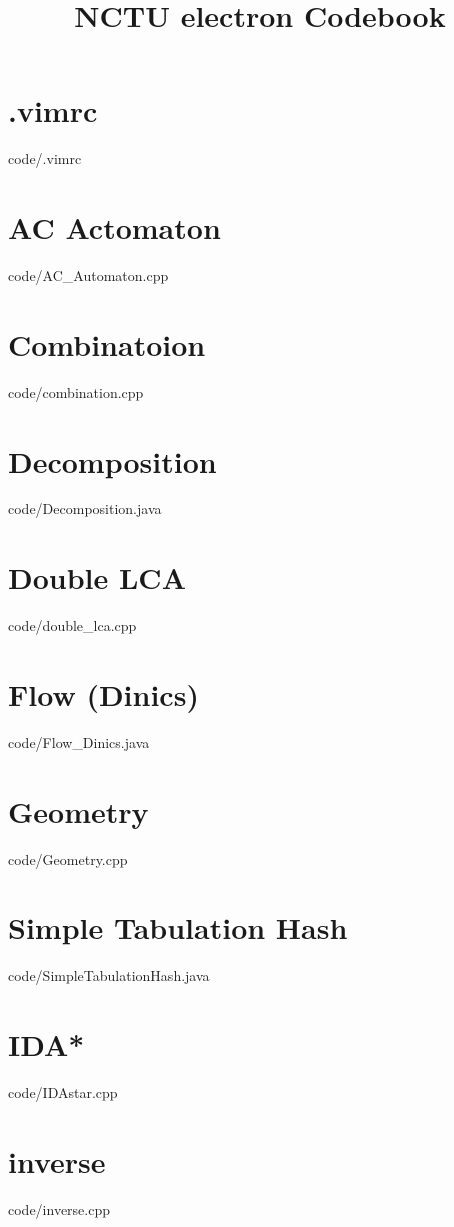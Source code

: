 \documentclass [landscape,10pt,a4paper,twocolumn]{article}
\title {NCTU electron Codebook}
\begin{document}
\maketitle
\tableofcontents
\newpage
\section{.vimrc}
 {code/.vimrc}
\section{AC Actomaton}
 {code/AC_Automaton.cpp}
\section{Combinatoion}
 {code/combination.cpp}
\section{Decomposition}
 {code/Decomposition.java}
\section{Double LCA}
 {code/double_lca.cpp}
\section{Flow (Dinics)}
 {code/Flow_Dinics.java}
\section{Geometry}
 {code/Geometry.cpp}
\section{Simple Tabulation Hash}
 {code/SimpleTabulationHash.java}
\section{IDA*}
 {code/IDAstar.cpp}
\section{inverse}
 {code/inverse.cpp}
\end{document}
